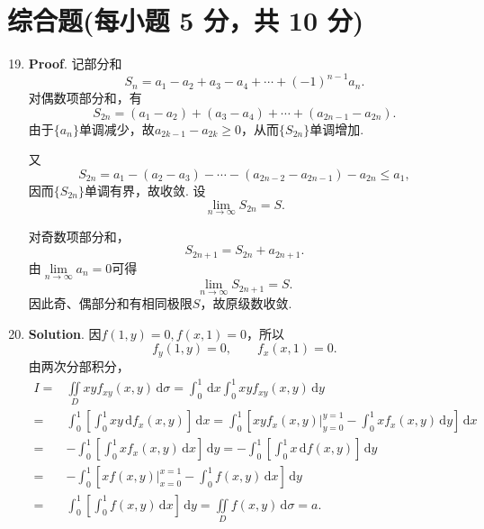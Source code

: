 \documentclass[../main.tex]{subfiles}
\begin{document}
\section{综合题(每小题 5 分，共 10 分)}
\begin{enumerate}
  \setcounter{enumi}{18}
  \item \textbf{Proof}. 记部分和
        \[
          S_n=a_1-a_2+a_3-a_4+\cdots+(-1)^{n-1}a_n.
        \]
        对偶数项部分和，有
        \[
          S_{2n}=(a_1-a_2)+(a_3-a_4)+\cdots+(a_{2n-1}-a_{2n}).
        \]
        由于$\{a_n\}$单调减少，故$a_{2k-1}-a_{2k}\geq0$，从而$\{S_{2n}\}$单调增加.

        又
        \[
          S_{2n}=a_1-(a_2-a_3)-\cdots-(a_{2n-2}-a_{2n-1})-a_{2n}\leq a_1,
        \]
        因而$\{S_{2n}\}$单调有界，故收敛. 设
        \[
          \lim_{n\to\infty}S_{2n}=S.
        \]

        对奇数项部分和，
        \[
          S_{2n+1}=S_{2n}+a_{2n+1}.
        \]
        由$\lim\limits_{n\to\infty}a_n=0$可得
        \[
          \lim_{n\to\infty}S_{2n+1}=S.
        \]
        因此奇、偶部分和有相同极限$S$，故原级数收敛.

  \item \textbf{Solution}. 因$f(1,y)=0,f(x,1)=0$，所以
        \[
          f_{y}(1,y)=0,\qquad f_{x}(x,1)=0.
        \]
        由两次分部积分，
        \[
          \begin{aligned}
            I= {} & \iint\limits_{D}xyf_{xy}(x,y)\,\mathrm{d}\sigma=\int_{0}^{1}\,\mathrm{d}x\int_{0}^{1}xyf_{xy}(x,y)\,\mathrm{d}y                                                                       \\
            = {}  & \int_{0}^{1}\left[\int_{0}^{1}xy\,\mathrm{d}f_{x}(x,y)\right]\,\mathrm{d}x = \int_{0}^{1}\left[xyf_{x}(x,y)\Big|_{y=0}^{y=1}-\int_{0}^{1}xf_{x}(x,y)\,\mathrm{d}y\right]\,\mathrm{d}x \\
            = {}  & -\int_{0}^{1}\left[\int_{0}^{1}xf_{x}(x,y)\,\mathrm{d}x\right]\,\mathrm{d}y=-\int_{0}^{1}\left[\int_{0}^{1}x\,\mathrm{d}f(x,y)\right]\,\mathrm{d}y                                    \\
            = {}  & -\int_{0}^{1}\left[xf(x,y)\Big|_{x=0}^{x=1}-\int_{0}^{1}f(x,y)\,\mathrm{d}x\right]\,\mathrm{d}y                                                                                       \\
            = {}  & \int_{0}^{1}\left[\int_{0}^{1}f(x,y)\,\mathrm{d}x\right]\,\mathrm{d}y=\iint\limits_{D}f(x,y)\,\mathrm{d}\sigma=a.
          \end{aligned}
        \]
\end{enumerate}
\end{document}
